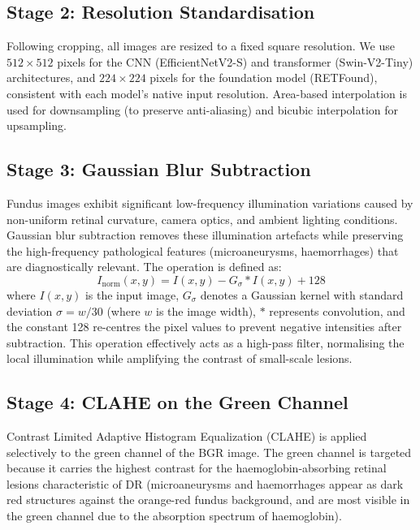 \subsection{Stage 2: Resolution Standardisation}
\label{sec:resize}

Following cropping, all images are resized to a fixed square resolution. We use $512 \times 512$ pixels for the CNN (EfficientNetV2-S) and transformer (Swin-V2-Tiny) architectures, and $224 \times 224$ pixels for the foundation model (RETFound), consistent with each model's native input resolution. Area-based interpolation is used for downsampling (to preserve anti-aliasing) and bicubic interpolation for upsampling.

\subsection{Stage 3: Gaussian Blur Subtraction}
\label{sec:gaussian_sub}

Fundus images exhibit significant low-frequency illumination variations caused by non-uniform retinal curvature, camera optics, and ambient lighting conditions. Gaussian blur subtraction removes these illumination artefacts while preserving the high-frequency pathological features (microaneurysms, haemorrhages) that are diagnostically relevant. The operation is defined as:
\begin{equation}
    I_{\text{norm}}(x, y) = I(x, y) - G_\sigma * I(x, y) + 128
    \label{eq:blur_sub}
\end{equation}
where $I(x, y)$ is the input image, $G_\sigma$ denotes a Gaussian kernel with standard deviation $\sigma = w / 30$ (where $w$ is the image width), $*$ represents convolution, and the constant 128 re-centres the pixel values to prevent negative intensities after subtraction. This operation effectively acts as a high-pass filter, normalising the local illumination while amplifying the contrast of small-scale lesions.

\subsection{Stage 4: CLAHE on the Green Channel}
\label{sec:clahe}

Contrast Limited Adaptive Histogram Equalization (CLAHE) \cite{zuiderveld1994clahe} is applied selectively to the green channel of the BGR image. The green channel is targeted because it carries the highest contrast for the haemoglobin-absorbing retinal lesions characteristic of DR (microaneurysms and haemorrhages appear as dark red structures against the orange-red fundus background, and are most visible in the green channel due to the absorption spectrum of haemoglobin).

